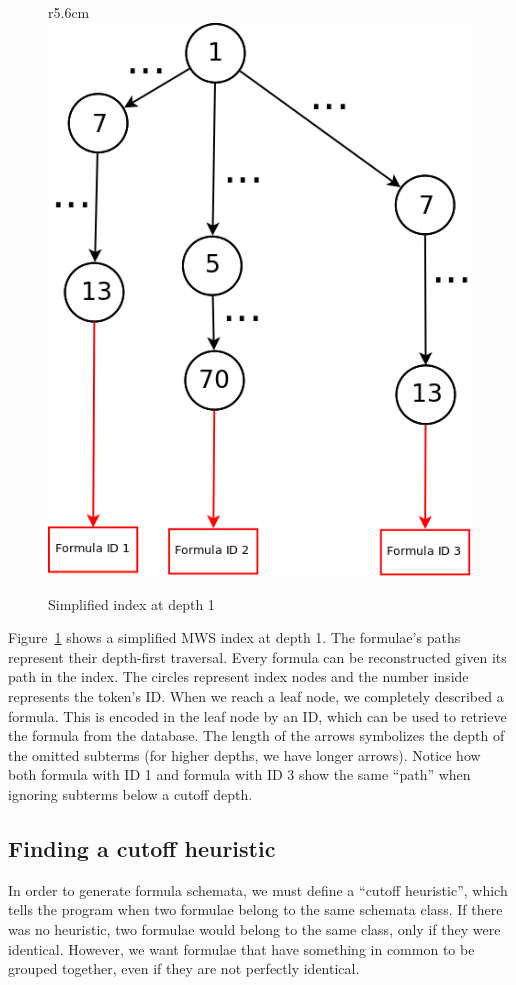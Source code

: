 \documentclass[a4paper,11pt,oneside]{article}
\def\MWS{\textsf{MWS}\xspace}
\begin{document}
\begin{figure}r{5.6cm}\vspace*{-1em}
    \includegraphics[scale=0.24]{img/FFG_Algo_diag.png}
\caption{Simplified index at depth 1}\label{fig:algoindex}
\end{figure}

Figure~\ref{fig:algoindex} shows a simplified \MWS index at depth 1.
The formulae's paths represent their depth-first traversal.
Every formula can be reconstructed given its path in the index.
The circles represent index nodes and the number inside represents
the token's ID. When we reach a leaf node, we completely described a
formula. This is encoded in the leaf node by an ID, which can be used
to retrieve the formula from the database.
The length of the arrows symbolizes the depth of the omitted subterms
(for higher depths, we have longer arrows).
Notice how both formula with ID 1 and formula with ID 3 show the same
``path'' when ignoring subterms below a cutoff depth.

\subsection{Finding a cutoff heuristic}\label{subsec:cutoffheur}
In order to generate formula schemata, we must define a ``cutoff heuristic'',
which tells the program when two formulae belong to the same schemata class.
If there was no heuristic, two formulae would belong to the same class,
only if they were identical. However, we want formulae that have something in
common to be grouped together, even if they are not perfectly identical.
\end{document}
